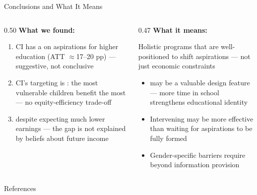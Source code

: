\documentclass[aspectratio=169, 10pt]{beamer}
\begin{document}
\begin{frame}{Conclusions and What It Means}
  \begin{columns}
    \begin{column}{0.50\textwidth}
      \textbf{What we found:}
      \begin{enumerate}
        \item CI has a  on aspirations for higher education (ATT $\approx$17--20 pp) — suggestive, not conclusive
        \item CI's targeting is : the most vulnerable children benefit the most — no equity-efficiency trade-off
        \item {} despite expecting much lower earnings — the gap is not explained by beliefs about future income
      \end{enumerate}
    \end{column}
    \begin{column}{0.47\textwidth}
      \textbf{What it means:}
      \begin{keybox}
        \small Holistic programs that  are well-positioned to shift aspirations — not just economic constraints
      \end{keybox}
      \vspace{0.4em}
      \begin{itemize}
        \item {} may be a valuable design feature — more time in school strengthens educational identity
        \item Intervening  may be more effective than waiting for aspirations to be fully formed
        \item Gender-specific barriers require  beyond information provision
      \end{itemize}
    \end{column}
  \end{columns}
\end{frame}

\begin{frame}[allowframebreaks]{References}
  \small
  
\end{frame}
\end{document}
